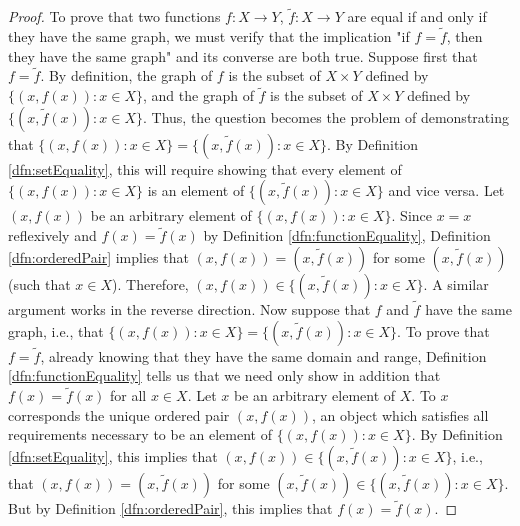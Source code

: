 \documentclass[../main.tex]{subfiles}
\begin{document}
\begin{enumerate}[ref={\thesection.\arabic*}]
\begin{proof}
        To prove that two functions $f:X\to Y$, $\tilde{f}:X\to Y$ are equal if and only if they have the same graph, we must verify that the implication "if $f=\tilde{f}$, then they have the same graph" and its converse are both true. Suppose first that $f=\tilde{f}$. By definition, the graph of $f$ is the subset of $X\times Y$ defined by $\{(x,f(x)):x\in X\}$, and the graph of $\tilde{f}$ is the subset of $X\times Y$ defined by $\{(x,\tilde{f}(x)):x\in X\}$. Thus, the question becomes the problem of demonstrating that $\{(x,f(x)):x\in X\}=\{(x,\tilde{f}(x)):x\in X\}$. By Definition \ref{dfn:setEquality}, this will require showing that every element of $\{(x,f(x)):x\in X\}$ is an element of $\{(x,\tilde{f}(x)):x\in X\}$ and vice versa. Let $(x,f(x))$ be an arbitrary element of $\{(x,f(x)):x\in X\}$. Since $x=x$ reflexively and $f(x)=\tilde{f}(x)$ by Definition \ref{dfn:functionEquality}, Definition \ref{dfn:orderedPair} implies that $(x,f(x))=(x,\tilde{f}(x))$ for some $(x,\tilde{f}(x))$ (such that $x\in X$). Therefore, $(x,f(x))\in\{(x,\tilde{f}(x)):x\in X\}$. A similar argument works in the reverse direction. Now suppose that $f$ and $\tilde{f}$ have the same graph, i.e., that $\{(x,f(x)):x\in X\}=\{(x,\tilde{f}(x)):x\in X\}$. To prove that $f=\tilde{f}$, already knowing that they have the same domain and range, Definition \ref{dfn:functionEquality} tells us that we need only show in addition that $f(x)=\tilde{f}(x)$ for all $x\in X$. Let $x$ be an arbitrary element of $X$. To $x$ corresponds the unique ordered pair $(x,f(x))$, an object which satisfies all requirements necessary to be an element of $\{(x,f(x)):x\in X\}$. By Definition \ref{dfn:setEquality}, this implies that $(x,f(x))\in\{(x,\tilde{f}(x)):x\in X\}$, i.e., that $(x,f(x))=(x,\tilde{f}(x))$ for some $(x,\tilde{f}(x))\in\{(x,\tilde{f}(x)):x\in X\}$. But by Definition \ref{dfn:orderedPair}, this implies that $f(x)=\tilde{f}(x)$.\par

\end{proof}
\end{enumerate}
\end{document}
